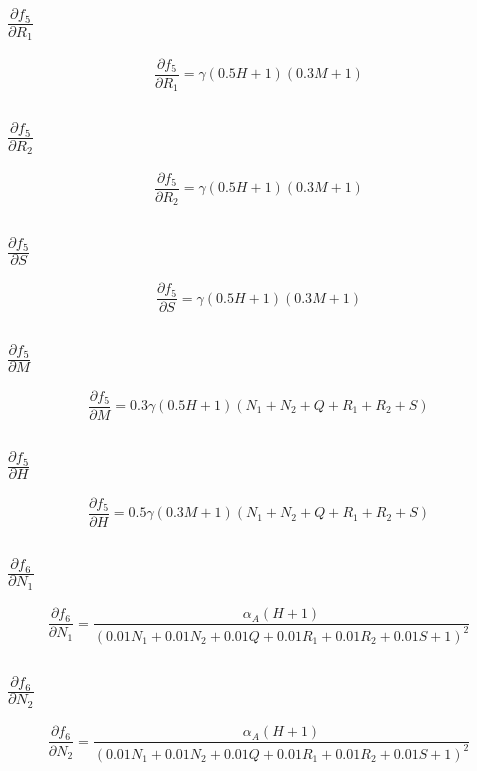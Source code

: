 \documentclass{article}
\begin{document}
\subsection{$\frac{\partial f_{5}}{\partial R_1}$}
\[
\frac{\partial f_{5}}{\partial R_1} = \gamma \left(0.5 H + 1\right) \left(0.3 M + 1\right)
\]

\subsection{$\frac{\partial f_{5}}{\partial R_2}$}
\[
\frac{\partial f_{5}}{\partial R_2} = \gamma \left(0.5 H + 1\right) \left(0.3 M + 1\right)
\]

\subsection{$\frac{\partial f_{5}}{\partial S}$}
\[
\frac{\partial f_{5}}{\partial S} = \gamma \left(0.5 H + 1\right) \left(0.3 M + 1\right)
\]

\subsection{$\frac{\partial f_{5}}{\partial M}$}
\[
\frac{\partial f_{5}}{\partial M} = 0.3 \gamma \left(0.5 H + 1\right) \left(N_{1} + N_{2} + Q + R_{1} + R_{2} + S\right)
\]

\subsection{$\frac{\partial f_{5}}{\partial H}$}
\[
\frac{\partial f_{5}}{\partial H} = 0.5 \gamma \left(0.3 M + 1\right) \left(N_{1} + N_{2} + Q + R_{1} + R_{2} + S\right)
\]

\subsection{$\frac{\partial f_{6}}{\partial N_1}$}
\[
\frac{\partial f_{6}}{\partial N_1} = \frac{\alpha_{A} \left(H + 1\right)}{\left(0.01 N_{1} + 0.01 N_{2} + 0.01 Q + 0.01 R_{1} + 0.01 R_{2} + 0.01 S + 1\right)^{2}}
\]

\subsection{$\frac{\partial f_{6}}{\partial N_2}$}
\[
\frac{\partial f_{6}}{\partial N_2} = \frac{\alpha_{A} \left(H + 1\right)}{\left(0.01 N_{1} + 0.01 N_{2} + 0.01 Q + 0.01 R_{1} + 0.01 R_{2} + 0.01 S + 1\right)^{2}}
\]
\end{document}
